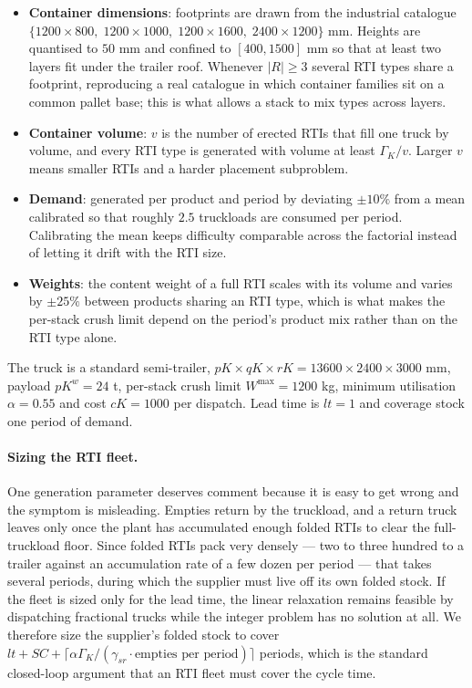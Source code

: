 \begin{itemize}
  \item \textbf{Container dimensions}: footprints are drawn from the
  industrial catalogue $\{1200\times800,\;1200\times1000,\;
  1200\times1600,\;2400\times1200\}$ mm. Heights are quantised to
  $50$ mm and confined to $[400,1500]$ mm so that at least two layers
  fit under the trailer roof. Whenever $|R|\ge3$ several RTI types
  share a footprint, reproducing a real catalogue in which container
  families sit on a common pallet base; this is what allows a stack to
  mix types across layers.

  \item \textbf{Container volume}: $v$ is the number of erected RTIs
  that fill one truck by volume, and every RTI type is generated with
  volume at least $\Gamma_{K}/v$. Larger $v$ means smaller RTIs and a
  harder placement subproblem.

  \item \textbf{Demand}: generated per product and period by deviating
  $\pm10\%$ from a mean calibrated so that roughly $2.5$ truckloads
  are consumed per period. Calibrating the mean keeps difficulty
  comparable across the factorial instead of letting it drift with the
  RTI size.

  \item \textbf{Weights}: the content weight of a full RTI scales with
  its volume and varies by $\pm25\%$ between products sharing an RTI
  type, which is what makes the per-stack crush limit depend on the
  period's product mix rather than on the RTI type alone.
\end{itemize}

The truck is a standard semi-trailer,
$pK\times qK\times rK=13600\times2400\times3000$ mm, payload
$pK^{w}=24$ t, per-stack crush limit $W^{\max}=1200$ kg, minimum
utilisation $\alpha=0.55$ and cost $cK=1000$ per dispatch. Lead time
is $lt=1$ and coverage stock one period of demand.

\paragraph{Sizing the RTI fleet.}
One generation parameter deserves comment because it is easy to get
wrong and the symptom is misleading. Empties return by the truckload,
and a return truck leaves only once the plant has accumulated enough
folded RTIs to clear the full-truckload floor. Since folded RTIs pack
very densely --- two to three hundred to a trailer against an
accumulation rate of a few dozen per period --- that takes several
periods, during which the supplier must live off its own folded
stock. If the fleet is sized only for the lead time, the linear
relaxation remains feasible by dispatching fractional trucks while the
integer problem has no solution at all. We therefore size the
supplier's folded stock to cover $lt+SC+\lceil
\alpha\Gamma_{K}/(\gamma_{sr}\cdot\text{empties per period})\rceil$
periods, which is the standard closed-loop argument that an RTI fleet
must cover the cycle time.

